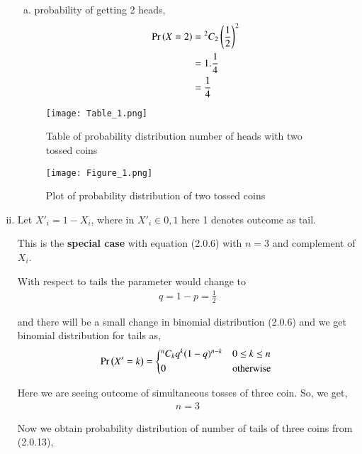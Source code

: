 \documentclass[journal,12pt,twocolumn]{IEEEtran}
\begin{document}
\begin{enumerate}[(i)]
\begin{enumerate}[(a)]
    \item probability of getting 2 heads,
        \begin{align}
            \begin{split}
                \Pr\left(X=2\right) &= {^2C_2}\left(\frac{1}{2}\right)^2\\
                &=1.\frac{1}{4}\\
                &=\frac{1}{4}
            \end{split}
        \end{align}
\end{enumerate}

\begin{figure}[h!]
    \centering
    \texttt{[image: Table\_1.png]}
    \caption{Table of probability distribution number of heads with two tossed coins}
    \label{fig:Table_1}
\end{figure}

\begin{figure}[h!]
    \centering
    \texttt{[image: Figure\_1.png]}
    \caption{Plot of probability distribution of two tossed coins}
    \label{fig:Two coins}
\end{figure}

\item

Let $X'_i=1-X_i$, where in $X'_i \in {0,1}$ here 1 denotes outcome as tail.

This is the \textbf{special case} with equation (2.0.6) with $n=3$ and complement of $X_i$.

With respect to tails the parameter would change to 
\begin{align}
    q=1-p=\frac{1}{2}
\end{align}

and there will be a small change in binomial distribution (2.0.6) and we get binomial distribution for tails as,
\begin{align}
   \pr{X'=k} =
  \begin{cases*}
    {^n C_k}q^{k}(1-q)^{n-k} & $0 \leq k \leq n$\\
      0 & otherwise
  \end{cases*}
\end{align}

Here we are seeing outcome of simultaneous tosses of three coin. So, we get,
\begin{align}
    n=3
\end{align}

Now we obtain probability distribution of number of tails of three coins from (2.0.13),


\end{enumerate}
\end{document}

